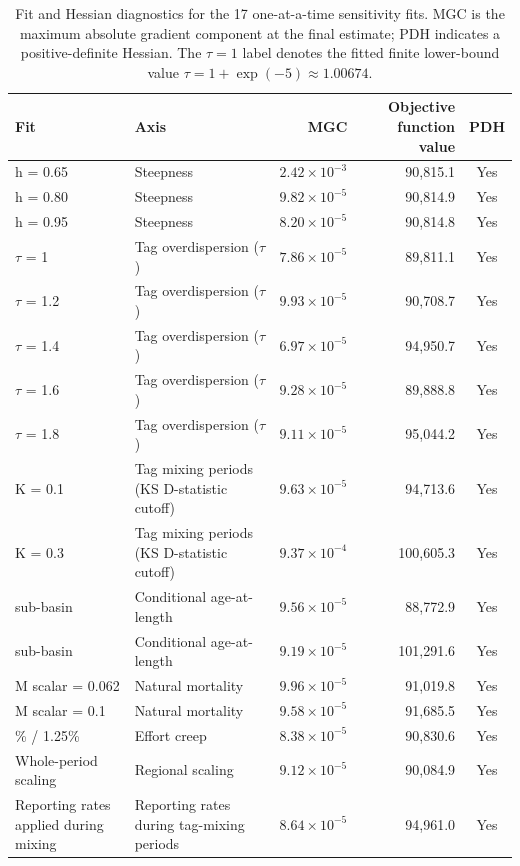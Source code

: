 \begin{table}[htbp]
\centering
\caption{Fit and Hessian diagnostics for the 17 one-at-a-time sensitivity fits. MGC is the maximum absolute gradient component at the final estimate; PDH indicates a positive-definite Hessian. The $\tau=1$ label denotes the fitted finite lower-bound value $\tau=1+\exp(-5)\approx1.00674$.}
\label{tab:bet-sensitivity-fit-diagnostics}
\scriptsize
\setlength{\tabcolsep}{2.2pt}
\renewcommand{\arraystretch}{1.04}
\begin{tabularx}{\textwidth}{@{}>{\raggedright\arraybackslash}X>{\raggedright\arraybackslash}Xrrc@{}}
\toprule
Fit & Axis & MGC & Objective function value & PDH \\
\midrule
h = 0.65 & Steepness & $2.42 \times 10^{-3}$ & 90,815.1 & Yes \\
h = 0.80 & Steepness & $9.82 \times 10^{-5}$ & 90,814.9 & Yes \\
h = 0.95 & Steepness & $8.20 \times 10^{-5}$ & 90,814.8 & Yes \\
$\tau$ = 1 & Tag overdispersion ($\tau$) & $7.86 \times 10^{-5}$ & 89,811.1 & Yes \\
$\tau$ = 1.2 & Tag overdispersion ($\tau$) & $9.93 \times 10^{-5}$ & 90,708.7 & Yes \\
$\tau$ = 1.4 & Tag overdispersion ($\tau$) & $6.97 \times 10^{-5}$ & 94,950.7 & Yes \\
$\tau$ = 1.6 & Tag overdispersion ($\tau$) & $9.28 \times 10^{-5}$ & 89,888.8 & Yes \\
$\tau$ = 1.8 & Tag overdispersion ($\tau$) & $9.11 \times 10^{-5}$ & 95,044.2 & Yes \\
K = 0.1 & Tag mixing periods (KS D-statistic cutoff) & $9.63 \times 10^{-5}$ & 94,713.6 & Yes \\
K = 0.3 & Tag mixing periods (KS D-statistic cutoff) & $9.37 \times 10^{-4}$ & 100,605.3 & Yes \\
0.5 sub-basin & Conditional age-at-length & $9.56 \times 10^{-5}$ & 88,772.9 & Yes \\
1.0 sub-basin & Conditional age-at-length & $9.19 \times 10^{-5}$ & 101,291.6 & Yes \\
M scalar = 0.062 & Natural mortality & $9.96 \times 10^{-5}$ & 91,019.8 & Yes \\
M scalar = 0.1 & Natural mortality & $9.58 \times 10^{-5}$ & 91,685.5 & Yes \\
2.5\% / 1.25\% & Effort creep & $8.38 \times 10^{-5}$ & 90,830.6 & Yes \\
Whole-period scaling & Regional scaling & $9.12 \times 10^{-5}$ & 90,084.9 & Yes \\
Reporting rates applied during mixing & Reporting rates during tag-mixing periods & $8.64 \times 10^{-5}$ & 94,961.0 & Yes \\
\bottomrule
\end{tabularx}
\end{table}

